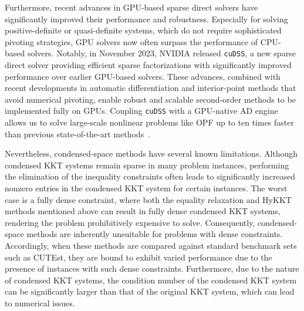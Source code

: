 \documentclass[smallextended]{svjour3}
\begin{document}
Furthermore, recent advances in GPU-based sparse direct solvers have significantly improved their performance and robustness.
Especially for solving positive-definite or quasi-definite systems, which do not require sophisticated pivoting strategies, GPU solvers now often surpass the performance of CPU-based solvers.
Notably, in November 2023, NVIDIA released {\tt cuDSS}, a new sparse direct solver providing efficient sparse factorizations with significantly improved performance over earlier GPU-based solvers.
These advances, combined with recent developments in automatic differentiation and interior-point methods that avoid numerical pivoting, enable robust and scalable second-order methods to be implemented fully on GPUs.
Coupling {\tt cuDSS} with a GPU-native AD engine allows us to solve large-scale nonlinear problems like OPF up to ten times faster than previous state-of-the-art methods~\cite{shin2023accelerating}.


Nevertheless, condensed-space methods have several known limitations.
Although condensed KKT systems remain sparse in many problem instances, performing the elimination of the inequality constraints often leads to significantly increased nonzero entries in the condensed KKT system
for certain instances.
The worst case is a fully dense constraint, where both the equality relaxation and HyKKT methods mentioned above can result in fully dense condensed KKT systems, rendering the problem prohibitively expensive to solve.
Consequently, condensed-space methods are inherently unsuitable for problems with dense constraints.
Accordingly, when these methods are compared against standard benchmark sets such as CUTEst, they are bound to exhibit varied performance due to the presence of instances with such dense constraints.
Furthermore, due to the nature of condensed KKT systems, the condition number of the condensed KKT system can be significantly larger than that of the original KKT system, which can lead to numerical issues.
\end{document}

